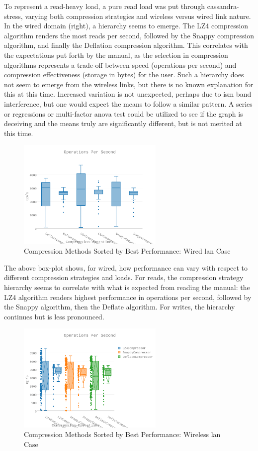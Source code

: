 	To represent a read-heavy load, a pure read load was put through cassandra-stress, varying both compression strategies and wireless versus wired link nature.  In the wired domain (right), a hierarchy seems to emerge.  The LZ4 compression algorithm renders the most reads per second, followed by the Snappy compression algorithm, and finally the Deflation compression algorithm.  This correlates with the expectations put forth by the manual, as the selection in compression algorithms represents a trade-off between speed (operations per second) and compression effectiveness (storage in bytes) for the user.  Such a hierarchy does not seem to emerge from the wireless links, but there is no known explanation for this at this time.  Increased variation is not unexpected, perhaps due to \gls{ism} band interference, but one would expect the means to follow a similar pattern.  A series or regressions or multi-factor \gls{anova} test could be utilized to see if the graph is deceiving and the means truly are significantly different, but is not merited at this time.

\begin{figure}[h]
\includegraphics[width=7cm]{Figures/figures-cs1_fig3.pdf}

\caption{Compression Methods Sorted by Best Performance: Wired \gls{lan} Case}

\label{fig:res}
\end{figure}
	The above box-plot shows, for wired, how performance can vary with respect to different compression strategies and loads.  For reads, the compression strategy hierarchy seems to correlate with what is expected from reading the manual: the LZ4 algorithm renders highest performance in operations per second, followed by the Snappy algorithm, then the Deflate algorithm.  For writes, the hierarchy continues but is less pronounced.  

\begin{figure}[h]
\includegraphics[width=7cm]{Figures/figures-cs1_fig4.pdf}

\caption{Compression Methods Sorted by Best Performance: Wireless \gls{lan} Case}

\label{fig:res}
\end{figure}

